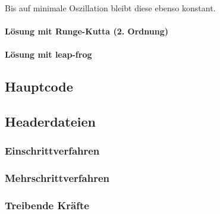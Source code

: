 \documentclass[
    oneside,
    ngerman,
    footinclude=false,
    captions=tableheading,
    DIV=12
]{scrartcl}
\begin{document}
                Bis auf minimale Oszillation bleibt diese ebenso konstant.

            \paragraph*{Lösung mit Runge-Kutta (2. Ordnung)}

            \paragraph*{Lösung mit leap-frog}
            
        \subaufgabe{}
            
        \subaufgabe{}

        \subaufgabe{}

        \subaufgabe{}
            

    \newpage
    \subsection*{Hauptcode}
        

    \subsection*{Headerdateien}
        \subsubsection*{Einschrittverfahren}
            

        \subsubsection*{Mehrschrittverfahren}
            

        \subsubsection*{Treibende Kräfte}
            
\end{document}
